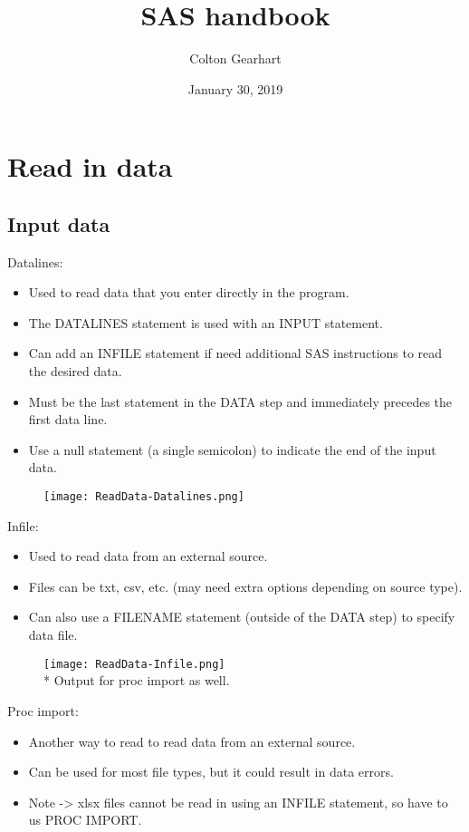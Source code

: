 \documentclass[11pt, oneside]{article}
\title{SAS handbook}
\author{Colton Gearhart}
\date{January 30, 2019}
\begin{document}
\maketitle
\tableofcontents
\newpage

\section{Read in data}

\subsection{Input data}

Datalines:
\begin{itemize}
\item Used to read data that you enter directly in the program.
\item The DATALINES statement is used with an INPUT statement.
\item Can add an INFILE statement if need additional SAS instructions to read the desired data.
\item Must be the last statement in the DATA step and immediately precedes the first data line.
\item Use a null statement (a single semicolon) to indicate the end of the input data. 
\end{itemize}

\begin{figure}[H]
\texttt{[image: ReadData-Datalines.png]}
\end{figure}

Infile:
\begin{itemize}
\item Used to read data from an external source.
\item Files can be txt, csv, etc. (may need extra options depending on source type).
\item Can also use a FILENAME statement (outside of the DATA step) to specify data file.
\end{itemize}

\begin{figure}[H]
\texttt{[image: ReadData-Infile.png]}
\\\footnotesize{* Output for proc import as well.}
\end{figure}

Proc import:
\begin{itemize}
\item Another way to read to read data from an external source.
\item Can be used for most file types, but it could result in data errors.
\item Note -> xlsx files cannot be read in using an INFILE statement, so have to us PROC IMPORT.
\end{itemize}

\end{document}
